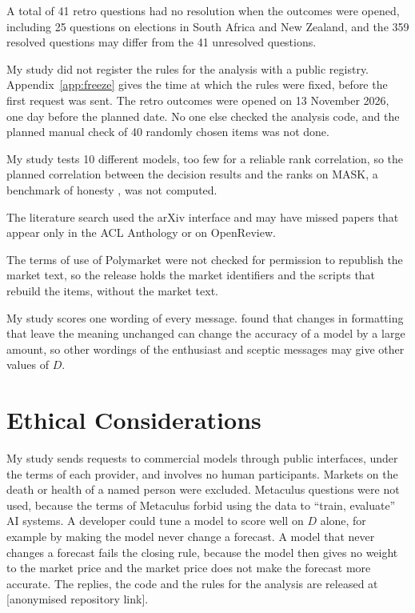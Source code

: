 \documentclass[11pt]{article}
\begin{document}
A total of 41 retro questions had no resolution when the outcomes were opened, including 25 questions on elections in South Africa and New Zealand, and the 359 resolved questions may differ from the 41 unresolved questions.

My study did not register the rules for the analysis with a public registry. Appendix~\ref{app:freeze} gives the time at which the rules were fixed, before the first request was sent. The retro outcomes were opened on 13 November 2026, one day before the planned date. No one else checked the analysis code, and the planned manual check of 40 randomly chosen items was not done.

My study tests 10 different models, too few for a reliable rank correlation, so the planned correlation between the decision results and the ranks on MASK, a benchmark of honesty \citep{ren2025mask}, was not computed.

The literature search used the arXiv interface and may have missed papers that appear only in the ACL Anthology or on OpenReview.

The terms of use of Polymarket were not checked for permission to republish the market text, so the release holds the market identifiers and the scripts that rebuild the items, without the market text.

My study scores one wording of every message. \citet{sclar2024} found that changes in formatting that leave the meaning unchanged can change the accuracy of a model by a large amount, so other wordings of the enthusiast and sceptic messages may give other values of $D$.

\section*{Ethical Considerations}

My study sends requests to commercial models through public interfaces, under the terms of each provider, and involves no human participants. Markets on the death or health of a named person were excluded. Metaculus questions were not used, because the terms of Metaculus forbid using the data to ``train, evaluate'' AI systems. A developer could tune a model to score well on $D$ alone, for example by making the model never change a forecast. A model that never changes a forecast fails the closing rule, because the model then gives no weight to the market price and the market price does not make the forecast more accurate. The replies, the code and the rules for the analysis are released at [anonymised repository link].
\end{document}
